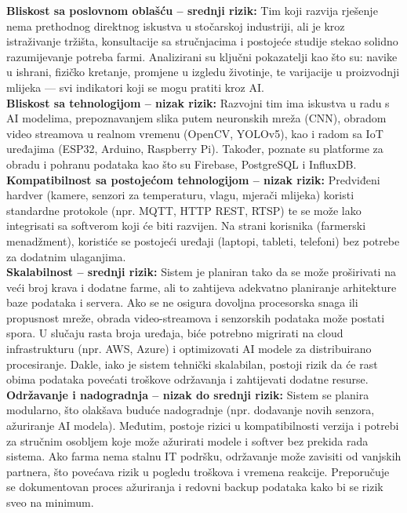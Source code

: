 \documentclass{article}
\begin{document}
\noindent
\textbf{Bliskost sa poslovnom oblašću – srednji rizik:}  
Tim koji razvija rješenje nema prethodnog direktnog iskustva u stočarskoj industriji, ali je kroz istraživanje tržišta, konsultacije sa stručnjacima i postojeće studije stekao solidno razumijevanje potreba farmi. Analizirani su ključni pokazatelji kao što su: navike u ishrani, fizičko kretanje, promjene u izgledu životinje, te varijacije u proizvodnji mlijeka — svi indikatori koji se mogu pratiti kroz AI.\\

\noindent
\textbf{Bliskost sa tehnologijom – nizak rizik:}  
Razvojni tim ima iskustva u radu s AI modelima, prepoznavanjem slika putem neuronskih mreža (CNN), obradom video streamova u realnom vremenu (OpenCV, YOLOv5), kao i radom sa IoT uređajima (ESP32, Arduino, Raspberry Pi). Također, poznate su platforme za obradu i pohranu podataka kao što su Firebase, PostgreSQL i InfluxDB.\\

\noindent
\textbf{Kompatibilnost sa postojećom tehnologijom – nizak rizik:}  
Predviđeni hardver (kamere, senzori za temperaturu, vlagu, mjerači mlijeka) koristi standardne protokole (npr. MQTT, HTTP REST, RTSP) te se može lako integrisati sa softverom koji će biti razvijen. Na strani korisnika (farmerski menadžment), koristiće se postojeći uređaji (laptopi, tableti, telefoni) bez potrebe za dodatnim ulaganjima.\\

\noindent
\textbf{Skalabilnost – srednji rizik:}  
Sistem je planiran tako da se može proširivati na veći broj krava i dodatne farme, ali to zahtijeva adekvatno planiranje arhitekture baze podataka i servera. Ako se ne osigura dovoljna procesorska snaga ili propusnost mreže, obrada video-streamova i senzorskih podataka može postati spora. U slučaju rasta broja uređaja, biće potrebno migrirati na cloud infrastrukturu (npr. AWS, Azure) i optimizovati AI modele za distribuirano procesiranje. Dakle, iako je sistem tehnički skalabilan, postoji rizik da će rast obima podataka povećati troškove održavanja i zahtijevati dodatne resurse.\\

\noindent
\textbf{Održavanje i nadogradnja – nizak do srednji rizik:}  
Sistem se planira modularno, što olakšava buduće nadogradnje (npr. dodavanje novih senzora, ažuriranje AI modela). Međutim, postoje rizici u kompatibilnosti verzija i potrebi za stručnim osobljem koje može ažurirati modele i softver bez prekida rada sistema. Ako farma nema stalnu IT podršku, održavanje može zavisiti od vanjskih partnera, što povećava rizik u pogledu troškova i vremena reakcije. Preporučuje se dokumentovan proces ažuriranja i redovni backup podataka kako bi se rizik sveo na minimum.\\
\end{document}
